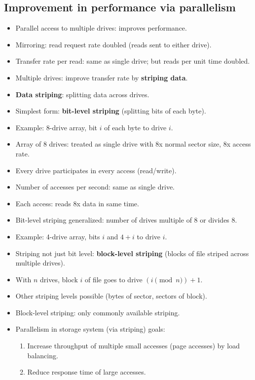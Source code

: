 \subsection{Improvement in performance via parallelism}
\begin{itemize}
    \item Parallel access to multiple drives: improves performance.
    \item Mirroring: read request rate doubled (reads sent to either drive).
    \item Transfer rate per read: same as single drive; but reads per unit time doubled.
    \item Multiple drives: improve transfer rate by \textbf{striping data}.
    \item \textbf{Data striping}: splitting data across drives.
    \item Simplest form: \textbf{bit-level striping} (splitting bits of each byte).
    \item Example: 8-drive array, bit $i$ of each byte to drive $i$.
    \item Array of 8 drives: treated as single drive with 8x normal sector size, 8x access rate.
    \item Every drive participates in every access (read/write).
    \item Number of accesses per second: same as single drive.
    \item Each access: reads 8x data in same time.
    \item Bit-level striping generalized: number of drives multiple of 8 or divides 8.
    \item Example: 4-drive array, bits $i$ and $4+i$ to drive $i$.
    \item Striping not just bit level: \textbf{block-level striping} (blocks of file striped across multiple drives).
    \item With $n$ drives, block $i$ of file goes to drive $(i \pmod n) + 1$.
    \item Other striping levels possible (bytes of sector, sectors of block).
    \item Block-level striping: only commonly available striping.
    \item Parallelism in storage system (via striping) goals:
    \begin{enumerate}
        \item Increase throughput of multiple small accesses (page accesses) by load balancing.
        \item Reduce response time of large accesses.
    \end{enumerate}
\end{itemize}

